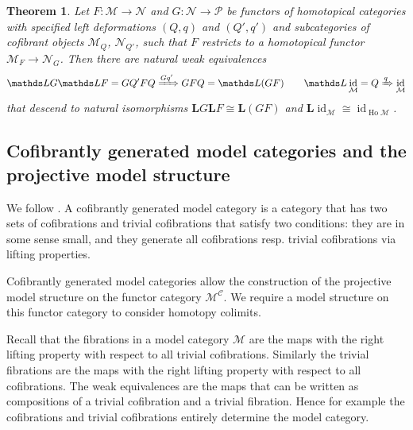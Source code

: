 \documentclass{scrartcl}
\theoremstyle{plain}
\newtheorem{theorem}{Theorem}[section]
\theoremstyle{definition}
\newcommand{\cat}[1]{\mathcal{#1}}
\newcommand{\iso}{\cong}
\newcommand{\xnto}{\xRightarrow}
\DeclareMathOperator{\id}{id}
\DeclareMathOperator{\Ho}{Ho}
\begin{document}
\begin{theorem}
    Let $F\colon \cat M\to\cat N$ and $G\colon \cat N\to\cat P$ be functors of homotopical categories with specified left deformations $(Q, q)$ and $(Q', q')$ and subcategories of cofibrant objects $\cat M_{Q}$, $\cat N_{Q'}$, such that $F$ restricts to a homotopical functor $\cat M_F\to\cat N_G$. Then there are natural weak equivalences
\begin{align*}
    \mathds LG \mathds LF = GQ' FQ \xnto{Gq'} GFQ = \mathds L(GF)\qquad \mathds L\id_{\cat M} = Q \xnto{q} \id_{\cat M}
\end{align*}
that descend to natural isomorphisms $\mathbf LG \mathbf LF\iso\mathbf L(GF)$ and $\mathbf L \id_{\cat M} \iso \id_{\Ho\cat M}$. 
\end{theorem}

\subsection{Cofibrantly generated model categories and the projective model structure}
We follow \cite[Chapter 11]{hirschhorn2003model}.
A cofibrantly generated model category is a category that has two sets of cofibrations and trivial cofibrations that satisfy two conditions: they are in some sense small, and they generate all cofibrations resp. trivial cofibrations via lifting properties. 

Cofibrantly generated model categories allow the construction of the projective model structure on the functor category $\cat M^{\cat C}$. We require a model structure on this functor category to consider homotopy colimits. 

Recall that the fibrations in a model category $\cat M$ are the maps with the right lifting property with respect to all trivial cofibrations. Similarly the trivial fibrations are the maps with the right lifting property with respect to all cofibrations. The weak equivalences are the maps that can be written as compositions of a trivial cofibration and a trivial fibration. Hence for example the cofibrations and trivial cofibrations entirely determine the model category. 
\end{document}
